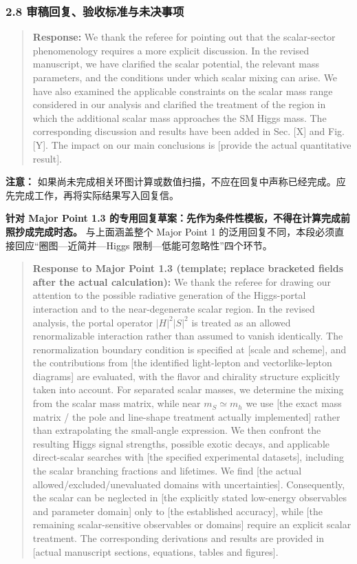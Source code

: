\documentclass[
  chinese,
  UTF8]{ctexart}
\begin{document}
\subsubsection{2.8 审稿回复、验收标准与未决事项}\label{major-1-step-8}

\begin{quote}
\textbf{Response:} We thank the referee for pointing out that the
scalar-sector phenomenology requires a more explicit discussion. In the
revised manuscript, we have clarified the scalar potential, the relevant
mass parameters, and the conditions under which scalar mixing can arise.
We have also examined the applicable constraints on the scalar mass
range considered in our analysis and clarified the treatment of the
region in which the additional scalar mass approaches the SM Higgs mass.
The corresponding discussion and results have been added in Sec. {[}X{]}
and Fig. {[}Y{]}. The impact on our main conclusions is {[}provide the
actual quantitative result{]}.
\end{quote}

\textbf{注意：}
如果尚未完成相关环图计算或数值扫描，不应在回复中声称已经完成。应先完成工作，再将实际结果写入回复信。

\textbf{针对 Major Point 1.3
的专用回复草案：先作为条件性模板，不得在计算完成前照抄成完成时态。}
与上面涵盖整个 Major Point 1
的泛用回复不同，本段必须直接回应``圈图---近简并---Higgs
限制---低能可忽略性''四个环节。

\begin{quote}
\textbf{Response to Major Point 1.3 (template; replace bracketed fields
after the actual calculation):} We thank the referee for drawing our
attention to the possible radiative generation of the Higgs-portal
interaction and to the near-degenerate scalar region. In the revised
analysis, the portal operator \(|H|^2|S|^2\) is treated as an allowed
renormalizable interaction rather than assumed to vanish identically.
The renormalization boundary condition is specified at {[}scale and
scheme{]}, and the contributions from {[}the identified light-lepton and
vectorlike-lepton diagrams{]} are evaluated, with the flavor and
chirality structure explicitly taken into account. For separated scalar
masses, we determine the mixing from the scalar mass matrix, while near
\(m_S\simeq m_h\) we use {[}the exact mass matrix / the pole and
line-shape treatment actually implemented{]} rather than extrapolating
the small-angle expression. We then confront the resulting Higgs signal
strengths, possible exotic decays, and applicable direct-scalar searches
with {[}the specified experimental datasets{]}, including the scalar
branching fractions and lifetimes. We find {[}the actual
allowed/excluded/unevaluated domains with uncertainties{]}.
Consequently, the scalar can be neglected in {[}the explicitly stated
low-energy observables and parameter domain{]} only to {[}the
established accuracy{]}, while {[}the remaining scalar-sensitive
observables or domains{]} require an explicit scalar treatment. The
corresponding derivations and results are provided in {[}actual
manuscript sections, equations, tables and figures{]}.
\end{quote}
\end{document}

